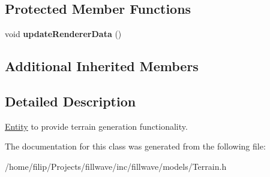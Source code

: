 \subsection*{Protected Member Functions}
\begin{DoxyCompactItemize}
\item 
void {\bfseries update\+Renderer\+Data} ()\hypertarget{classflw_1_1flf_1_1Terrain_a63ba1f58a158096874558bfccd15ae7f}{}\label{classflw_1_1flf_1_1Terrain_a63ba1f58a158096874558bfccd15ae7f}

\end{DoxyCompactItemize}
\subsection*{Additional Inherited Members}


\subsection{Detailed Description}
\hyperlink{classflw_1_1flf_1_1Entity}{Entity} to provide terrain generation functionality. 

The documentation for this class was generated from the following file\+:\begin{DoxyCompactItemize}
\item 
/home/filip/\+Projects/fillwave/inc/fillwave/models/Terrain.\+h\end{DoxyCompactItemize}
